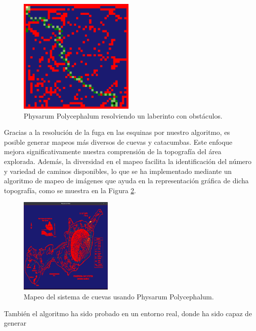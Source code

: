     \begin{figure}[htbp]
        \centerline{\includegraphics[width=0.5\textwidth]{./images/desarrollo/physarum/Obstaculos1.png}}
        \caption{Physarum Polycephalum resolviendo un laberinto con obst\'aculos.}
        \label{fig:physarumObstacles1}
    \end{figure}
    \vskip 0.5cm
    Gracias a la resoluci\'on de la fuga en las esquinas por nuestro algoritmo, es posible generar mapeos m\'as diversos 
        de cuevas y catacumbas. Este enfoque mejora significativamente nuestra comprensi\'on 
        de la topograf\'ia del \'area explorada. Adem\'as, la diversidad en el mapeo facilita la identificaci\'on 
        del n\'umero y variedad de caminos disponibles, lo que se ha implementado mediante un algoritmo de mapeo de im\'agenes que 
        ayuda en la representaci\'on gr\'afica de dicha topograf\'ia, como se muestra en la Figura \ref{fig:CaveSystemPhysarum}.
    \vskip 0.5cm
        \begin{figure}[htbp]
            \centerline{\includegraphics[width=0.40\textwidth]{./images/desarrollo/physarum/CaveSystemPhysarum.png}}
            \caption{Mapeo del sistema de cuevas usando Physarum Polycephalum.}
            \label{fig:CaveSystemPhysarum}
        \end{figure}
        \vskip 0.2cm
        Tambi\'en el algoritmo ha sido probado en un entorno real, donde ha sido capaz de generar 
